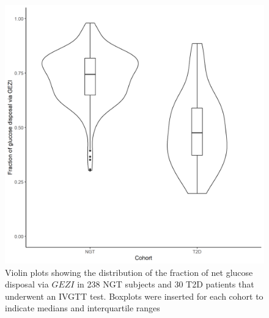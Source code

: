 \documentclass[utf8]{frontiersSCNS} %
\begin{document}
\begin{figure}[h!]
\begin{center}
\includegraphics[width=15cm]{frac_IVGTT.PNG}
\end{center}
\caption{Violin plots showing the distribution of the fraction of net glucose disposal via $GEZI$ in 238 NGT subjects and 30 T2D patients that underwent an IVGTT test. Boxplots were inserted for each cohort to indicate medians and interquartile ranges}
\label{fig: frac}
\end{figure}

\end{document}
